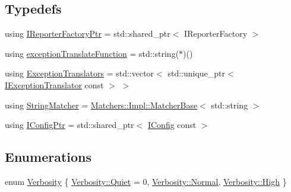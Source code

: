 \subsection*{Typedefs}
\begin{DoxyCompactItemize}
\item 
using \mbox{\hyperlink{namespace_catch_ad1b36ac40c2739e52fd453dcdddf0d09}{I\+Reporter\+Factory\+Ptr}} = std\+::shared\+\_\+ptr$<$ I\+Reporter\+Factory $>$
\item 
using \mbox{\hyperlink{namespace_catch_ae8d8673884dc36b98875106322a2a37b}{exception\+Translate\+Function}} = std\+::string($\ast$)()
\item 
using \mbox{\hyperlink{namespace_catch_a7ad07967e688fdc03cf784f58be4b741}{Exception\+Translators}} = std\+::vector$<$ std\+::unique\+\_\+ptr$<$ \mbox{\hyperlink{struct_catch_1_1_i_exception_translator}{I\+Exception\+Translator}} const  $>$ $>$
\item 
using \mbox{\hyperlink{namespace_catch_aba438977e831821a2eeca82b9b4f4af2}{String\+Matcher}} = \mbox{\hyperlink{struct_catch_1_1_matchers_1_1_impl_1_1_matcher_base}{Matchers\+::\+Impl\+::\+Matcher\+Base}}$<$ std\+::string $>$
\item 
using \mbox{\hyperlink{namespace_catch_afd20a5d4f9d2f4d525db81a7765367b0}{I\+Config\+Ptr}} = std\+::shared\+\_\+ptr$<$ \mbox{\hyperlink{struct_catch_1_1_i_config}{I\+Config}} const  $>$
\end{DoxyCompactItemize}
\subsection*{Enumerations}
\begin{DoxyCompactItemize}
\item 
enum \mbox{\hyperlink{namespace_catch_af85c0d46dfe687d923a157362fd07737}{Verbosity}} \{ \mbox{\hyperlink{namespace_catch_af85c0d46dfe687d923a157362fd07737a098753f8980036f4b936e3d4b6997111}{Verbosity\+::\+Quiet}} = 0, 
\mbox{\hyperlink{namespace_catch_af85c0d46dfe687d923a157362fd07737a960b44c579bc2f6818d2daaf9e4c16f0}{Verbosity\+::\+Normal}}, 
\mbox{\hyperlink{namespace_catch_af85c0d46dfe687d923a157362fd07737a655d20c1ca69519ca647684edbb2db35}{Verbosity\+::\+High}}
 \}
\end{DoxyCompactItemize}
